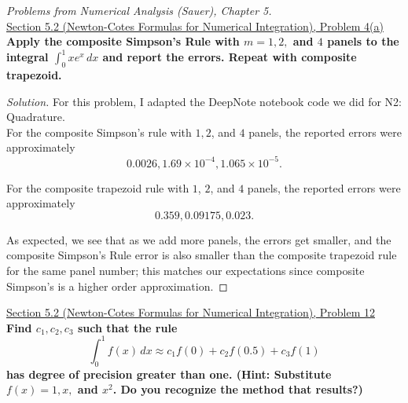 \documentclass[11pt]{article}
\newenvironment{solution}
  {\renewcommand\qedsymbol{$\blacksquare$}\begin{proof}[Solution]}
  {\end{proof}}
\theoremstyle{definition}
\begin{document}
\newpage

\textit{Problems from Numerical Analysis (Sauer), Chapter 5.} \\ 

\underline{Section 5.2 (Newton-Cotes Formulas for Numerical Integration), Problem 4(a)} \\

\textbf{Apply the composite Simpson's Rule with $m = 1, 2,$ and $4$ panels to the integral $\int_0^1 xe^x \, dx$ and report the errors. Repeat with composite trapezoid.} \\

\begin{solution}
For this problem, I adapted the DeepNote notebook code we did for N2: Quadrature. \\

For the composite Simpson's rule with $1, 2$, and $4$ panels, the reported errors were approximately
\[ \boxed{0.0026, 1.69\times 10^{-4}, 1.065\times 10^{-5}.}\]

For the composite trapezoid rule with $1$, $2$, and $4$ panels, the reported errors were approximately
\[ \boxed{0.359, 0.09175, 0.023}.\]

As expected, we see that as we add more panels, the errors get smaller, and the composite Simpson's Rule error is also smaller than the composite trapezoid rule for the same panel number; this matches our expectations since composite Simpson's is a higher order approximation.
\end{solution}

\newpage

\underline{Section 5.2 (Newton-Cotes Formulas for Numerical Integration), Problem 12} \\

\textbf{Find $c_1, c_2, c_3$ such that the rule \[ \int_0^1 f(x) \, dx \approx c_1f(0) + c_2f(0.5) + c_3f(1)\] has
degree of precision greater than one. (Hint: Substitute $f(x) = 1, x,$ and $x^2$. Do you recognize the method that results?)} \\
\end{document}
